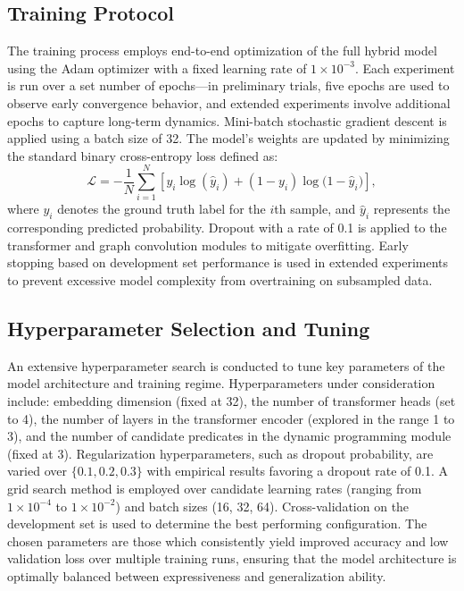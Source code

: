\documentclass{article}
\begin{document}
\subsection{Training Protocol}
The training process employs end-to-end optimization of the full hybrid model using the Adam optimizer with a fixed learning rate of \(1\times10^{-3}\). Each experiment is run over a set number of epochs—in preliminary trials, five epochs are used to observe early convergence behavior, and extended experiments involve additional epochs to capture long-term dynamics. Mini-batch stochastic gradient descent is applied using a batch size of 32. The model’s weights are updated by minimizing the standard binary cross-entropy loss defined as:
\[
\mathcal{L} = -\frac{1}{N}\sum_{i=1}^{N}\left[y_i \log(\hat{y}_i) + (1-y_i)\log\bigl(1-\hat{y}_i\bigr)\right],
\]
where \(y_i\) denotes the ground truth label for the \(i\)th sample, and \(\hat{y}_i\) represents the corresponding predicted probability. Dropout with a rate of 0.1 is applied to the transformer and graph convolution modules to mitigate overfitting. Early stopping based on development set performance is used in extended experiments to prevent excessive model complexity from overtraining on subsampled data.

\subsection{Hyperparameter Selection and Tuning}
An extensive hyperparameter search is conducted to tune key parameters of the model architecture and training regime. Hyperparameters under consideration include: embedding dimension (fixed at 32), the number of transformer heads (set to 4), the number of layers in the transformer encoder (explored in the range 1 to 3), and the number of candidate predicates in the dynamic programming module (fixed at 3). Regularization hyperparameters, such as dropout probability, are varied over \(\{0.1, 0.2, 0.3\}\) with empirical results favoring a dropout rate of 0.1. A grid search method is employed over candidate learning rates (ranging from \(1\times10^{-4}\) to \(1\times10^{-2}\)) and batch sizes (16, 32, 64). Cross-validation on the development set is used to determine the best performing configuration. The chosen parameters are those which consistently yield improved accuracy and low validation loss over multiple training runs, ensuring that the model architecture is optimally balanced between expressiveness and generalization ability.
\end{document}
